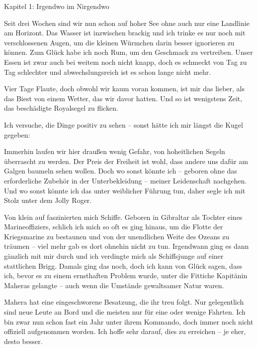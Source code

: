 
{\label{0Kapitel 1: Irgendwo im Nirgendwo}\vspace{0.5cm}\noindent\LARGE Kapitel 1: Irgendwo im Nirgendwo}
\renewcommand{\storychapter}{Kapitel 1: Irgendwo im Nirgendwo}

\vspace{0.5cm}\noindent
Seit drei Wochen sind wir nun schon auf hoher See ohne auch nur eine Landlinie am Horizont. Das Wasser ist inzwischen brackig und ich trinke es nur noch mit verschlossenen Augen, um die kleinen Würmchen darin besser ignorieren zu können. Zum Glück habe ich noch Rum, um den Geschmack zu vertreiben. Unser Essen ist zwar auch bei weitem noch nicht knapp, doch es schmeckt von Tag zu Tag schlechter und abwechslungsreich ist es schon lange nicht mehr.

\vspace{0.5cm}\noindent
Vier Tage Flaute, doch obwohl wir kaum voran kommen, ist mir das lieber, als das Biest von einem Wetter, das wir davor hatten. Und so ist wenigstens Zeit, das beschädigte Royalsegel zu flicken.

Ich versuche, die Dinge positiv zu sehen -- sonst hätte ich mir längst die Kugel gegeben:

Immerhin laufen wir hier draußen wenig Gefahr, von hoheitlichen Segeln überrascht zu werden. Der Preis der Freiheit ist wohl, dass andere uns dafür am Galgen baumeln sehen wollen. Doch wo sonst könnte ich -- geboren ohne das erforderliche Zubehör in der Unterbekleidung -- meiner Leidenschaft nachgehen. Und wo sonst könnte ich das unter weiblicher Führung tun, daher segle ich mit Stolz unter dem Jolly Roger.

Von klein auf faszinierten mich Schiffe. Geboren in Gibraltar als Tochter eines Marineoffiziers, schlich ich mich so oft es ging hinaus, um die Flotte der Kriegsmarine zu bestaunen und von der unendlichen Weite des Ozeans zu träumen -- viel mehr gab es dort ohnehin nicht zu tun. Irgendwann ging es dann gänzlich mit mir durch und ich verdingte mich als Schiffsjunge auf einer stattlichen Brigg. Damals ging das noch, doch ich kann von Glück sagen, dass ich, bevor es zu einem ernsthaften Problem wurde, unter die Fittiche Kapitänin Maheras gelangte -- auch wenn die Umstände gewaltsamer Natur waren. 

Mahera hat eine eingeschworene Besatzung, die ihr treu folgt. Nur gelegentlich sind neue Leute an Bord und die meisten nur für eine oder wenige Fahrten. Ich bin zwar nun schon fast ein Jahr unter ihrem Kommando, doch immer noch nicht offiziell aufgenommen worden. Ich hoffe sehr darauf, dies zu erreichen -- je eher, desto besser.

